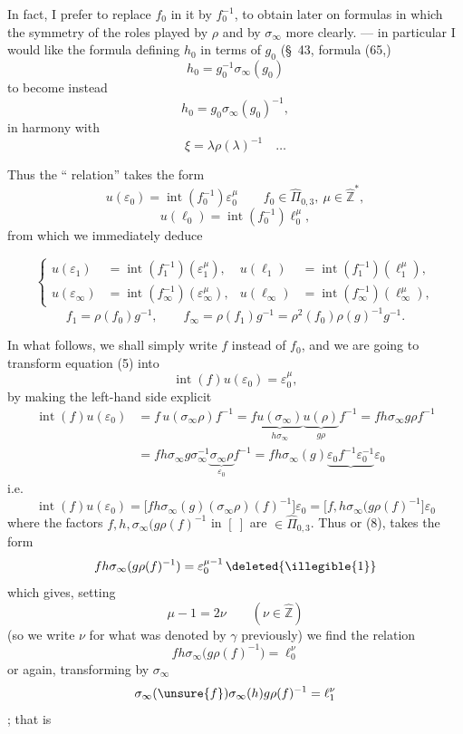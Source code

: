 In fact, I prefer to replace $f_0$ in it by $f_0^{-1}$, to obtain later on formulas in which the symmetry of the roles played by $\rho$ and by $\sigma_\infty$  more clearly. --- in particular I would like the formula defining $h_0$ in terms of $g_0$ (\S\ 43, formula (65,)
\[
h_0=g_0^{-1}\sigma_\infty(g_0)
\]
to become instead
\[
h_0=g_0\sigma_\infty(g_0)^{-1},
\]
in harmony with
\[
\xi=\lambda\rho(\lambda)^{-1}\quad\dots
\]

Thus the `` relation'' takes the form
\[
\tag{5}
u(\varepsilon_0)=\operatorname{int}(f_0^{-1})\varepsilon_0^\mu
\qquad f_0\in\widehat{\Pi}_{0,3},\ \mu\in\widehat{\mathbb Z}^{*},
\]
\[
\tag{6}
u(\ell_0)=\operatorname{int}(f_0^{-1})\ell_0^\mu,
\]
from which we immediately deduce



\[
\tag{7}
\left\{
\begin{aligned}
u(\varepsilon_1)&=\operatorname{int}(f_1^{-1})(\varepsilon_1^\mu),
&u(\ell_1)&=\operatorname{int}(f_1^{-1})(\ell_1^\mu),\\
u(\varepsilon_\infty)&=\operatorname{int}(f_\infty^{-1})(\varepsilon_\infty^\mu),
&u(\ell_\infty)&=\operatorname{int}(f_\infty^{-1})(\ell_\infty^\mu),
\end{aligned}
\right.
\]
\[
\tag{8}
f_1=\rho(f_0)g^{-1},\qquad
f_\infty=\rho(f_1)g^{-1}=\rho^2(f_0)\rho(g)^{-1}g^{-1}.
\]

In what follows, we shall simply write $f$ instead of $f_0$, and we are going to transform equation (5)  into
\[
\tag{8bis}
\operatorname{int}(f)u(\varepsilon_0)=\varepsilon_0^\mu,
\]
by making the left-hand side explicit
\[
\begin{aligned}
\operatorname{int}(f)u(\varepsilon_0)
&=f\,u(\sigma_\infty\rho)f^{-1}
=f\underbrace{u(\sigma_\infty)}_{h\sigma_\infty}\underbrace{u(\rho)}_{g\rho}f^{-1}
=fh\sigma_\infty g\rho f^{-1}\\
&=fh\sigma_\infty g\sigma_\infty^{-1}\underbrace{\sigma_\infty\rho}_{\varepsilon_0}f^{-1}
=fh\sigma_\infty(g)\underbrace{\varepsilon_0f^{-1}\varepsilon_0^{-1}}\varepsilon_0
\end{aligned}
\]
i.e.
\[
\tag{9}
\operatorname{int}(f)u(\varepsilon_0)
=\bigl[fh\sigma_\infty(g)(\sigma_\infty\rho)(f)^{-1}\bigr]\varepsilon_0
=\bigl[f,h\sigma_\infty(g\rho(f)^{-1}\bigr]\varepsilon_0
\]
where the  factors $f,h,\sigma_\infty(g\rho(f)^{-1}$ in $[\ ]$ are $\in\widehat{\Pi}_{0,3}$. Thus  or (8), takes the form
\[
fh\sigma_\infty(g\rho(f)^{-1})=\varepsilon_0^{\mu-1}\,\deleted{\illegible{1}}
\]
which gives, setting
\[
\tag{10}
\mu-1=2\nu\qquad(\nu\in\widehat{\mathbb Z})
\]
(so we write $\nu$ for what was denoted by $\gamma$ previously) we find the relation
\[
fh\sigma_\infty\bigl(g\rho(f)^{-1}\bigr)=\ell_0^\nu
\]
or again, transforming by $\sigma_\infty$
\[
\sigma_\infty(\unsure{f})\sigma_\infty(h)g\rho(f)^{-1}=\ell_1^\nu
\]
; that is

